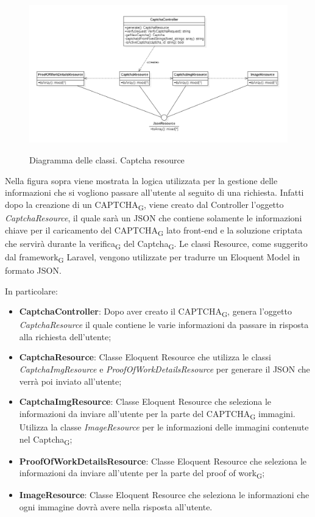 \begin{figure}[H]
	\centering
	\includegraphics[scale = 0.6]{img/captcha_resource.png}\\
	\caption{Diagramma delle classi. Captcha resource}
\end{figure}

Nella figura sopra viene mostrata la logica utilizzata per la gestione delle informazioni che si vogliono passare all'utente al seguito di una richiesta. Infatti dopo la creazione di un CAPTCHA\textsubscript{G}, viene creato dal Controller l'oggetto \textit{CaptchaResource}, il quale sarà un JSON che contiene solamente le informazioni chiave per il caricamento del CAPTCHA\textsubscript{G} lato front-end e la soluzione criptata che servirà durante la verifica\textsubscript{G} del Captcha\textsubscript{G}. Le classi Resource, come suggerito dal framework\textsubscript{G} Laravel, vengono utilizzate per tradurre un Eloquent Model in formato JSON.

In particolare:
\begin{itemize}
	\item \textbf{CaptchaController}: Dopo aver creato il CAPTCHA\textsubscript{G}, genera l'oggetto \textit{CaptchaResource} il quale contiene le varie informazioni da passare in risposta alla richiesta dell'utente;
	\item \textbf{CaptchaResource}: Classe Eloquent Resource che utilizza le classi \textit{CaptchaImgResource} e \textit{ProofOfWorkDetailsResource} per generare il JSON che verrà poi inviato all'utente;
	\item \textbf{CaptchaImgResource}: Classe Eloquent Resource che seleziona le informazioni da inviare all'utente per la parte del CAPTCHA\textsubscript{G} immagini. Utilizza la classe \textit{ImageResource} per le informazioni delle immagini contenute nel Captcha\textsubscript{G};
	\item \textbf{ProofOfWorkDetailsResource}: Classe Eloquent Resource che seleziona le informazioni da inviare all'utente per la parte del proof of work\textsubscript{G};
	\item \textbf{ImageResource}: Classe Eloquent Resource che seleziona le informazioni che ogni immagine dovrà avere nella risposta all'utente.
\end{itemize}
\newpage

